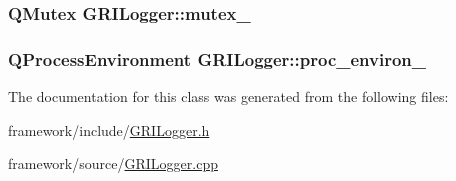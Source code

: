 \hypertarget{classGRILogger_aacbb428753b5108e5608d23bed5ff38d}{
\subsubsection[{mutex\-\_\-}]{\setlength{\rightskip}{0pt plus 5cm}\-Q\-Mutex {\bf \-G\-R\-I\-Logger\-::mutex\-\_\-}}}\label{classGRILogger_aacbb428753b5108e5608d23bed5ff38d}
\hypertarget{classGRILogger_aa603a5003a56547f48ef748123aedeec}{
\subsubsection[{proc\-\_\-environ\-\_\-}]{\setlength{\rightskip}{0pt plus 5cm}\-Q\-Process\-Environment {\bf \-G\-R\-I\-Logger\-::proc\-\_\-environ\-\_\-}}}\label{classGRILogger_aa603a5003a56547f48ef748123aedeec}


\-The documentation for this class was generated from the following files\-:\begin{DoxyCompactItemize}
\item 
framework/include/\hyperlink{GRILogger_8h}{\-G\-R\-I\-Logger.\-h}\item 
framework/source/\hyperlink{GRILogger_8cpp}{\-G\-R\-I\-Logger.\-cpp}\end{DoxyCompactItemize}
